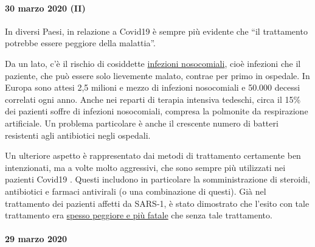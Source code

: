 \hypertarget{30-marzo-2020-ii}{%
\paragraph{30 marzo 2020 (II)}\label{30-marzo-2020-ii}}

In diversi Paesi, in relazione a Covid19 è sempre più evidente che ``il
trattamento potrebbe essere peggiore della malattia''.

Da un lato, c'è il rischio di cosiddette
\href{https://it.wikipedia.org/wiki/Infezioni_correlate_all\%27assistenza}{infezioni
nosocomiali}, cioè infezioni che il paziente, che può essere solo
lievemente malato, contrae per primo in ospedale. In Europa sono attesi
2,5 milioni e mezzo di infezioni nosocomiali e 50.000 decessi correlati
ogni anno. Anche nei reparti di terapia intensiva tedeschi, circa il
15\% dei pazienti soffre di infezioni nosocomiali, compresa la polmonite
da respirazione artificiale. Un problema particolare è anche il
crescente numero di batteri resistenti agli antibiotici negli ospedali.

Un ulteriore aspetto è rappresentato dai metodi di trattamento
certamente ben intenzionati, ma a volte molto aggressivi, che sono
sempre più utilizzati nei pazienti Covid19 . Questi includono in
particolare la somministrazione di steroidi, antibiotici e farmaci
antivirali (o una combinazione di questi). Già nel trattamento dei
pazienti affetti da SARS-1, è stato dimostrato che l'esito con tale
trattamento era
\href{https://www.sciencedaily.com/releases/2020/02/200206110703.htm}{spesso
peggiore e più fatale} che senza tale trattamento.

\hypertarget{29-marzo-2020}{%
\paragraph{29 marzo 2020}\label{29-marzo-2020}}

